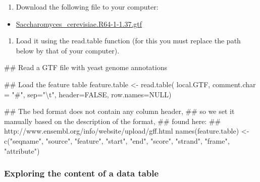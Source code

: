 \documentclass[]{article}
\newenvironment{Shaded}{\begin{snugshade}}{\end{snugshade}}
\newcommand{\KeywordTok}[1]{\textcolor[rgb]{0.94,0.87,0.69}{#1}}
\newcommand{\DataTypeTok}[1]{\textcolor[rgb]{0.87,0.87,0.75}{#1}}
\newcommand{\CharTok}[1]{\textcolor[rgb]{0.86,0.64,0.64}{#1}}
\newcommand{\StringTok}[1]{\textcolor[rgb]{0.80,0.58,0.58}{#1}}
\newcommand{\OtherTok}[1]{\textcolor[rgb]{0.94,0.94,0.56}{#1}}
\newcommand{\NormalTok}[1]{\textcolor[rgb]{0.80,0.80,0.80}{#1}}
\providecommand{\tightlist}{%
  \setlength{\itemsep}{0pt}\setlength{\parskip}{0pt}}
\begin{document}
\begin{enumerate}
\def\labelenumi{\arabic{enumi}.}
\tightlist
\item
  Download the following file to your computer:
\end{enumerate}

\begin{itemize}
\tightlist
\item
  \href{../../data/Saccharomyces_cerevisiae/Saccharomyces_cerevisiae.R64-1-1.37.gtf}{Saccharomyces\_cerevisiae.R64-1-1.37.gtf}
\end{itemize}

\begin{enumerate}
\def\labelenumi{\arabic{enumi}.}
\setcounter{enumi}{1}
\tightlist
\item
  Load it using the read.table function (for this you must replace the
  path below by that of your computer).
\end{enumerate}

\begin{Shaded}
\begin{Highlighting}[]
\NormalTok{## Read a GTF file with yeast genome annotations}

\NormalTok{## Load the feature table}
\NormalTok{feature.table <-}\StringTok{ }\KeywordTok{read.table}\NormalTok{(}
\NormalTok{  local.GTF, }
  \DataTypeTok{comment.char =} \StringTok{"#"}\NormalTok{, }
  \DataTypeTok{sep=}\StringTok{"}\CharTok{\textbackslash{}t}\StringTok{"}\NormalTok{, }
  \DataTypeTok{header=}\OtherTok{FALSE}\NormalTok{, }
  \DataTypeTok{row.names=}\OtherTok{NULL}\NormalTok{)}

\NormalTok{## The bed format does not contain any column header, }
\NormalTok{## so we set it manually based on the description of the format, }
\NormalTok{## found here: }
\NormalTok{##     http://www.ensembl.org/info/website/upload/gff.html}
\KeywordTok{names}\NormalTok{(feature.table) <-}\StringTok{ }\KeywordTok{c}\NormalTok{(}\StringTok{"seqname"}\NormalTok{, }\StringTok{"source"}\NormalTok{, }\StringTok{"feature"}\NormalTok{, }\StringTok{"start"}\NormalTok{, }\StringTok{"end"}\NormalTok{, }\StringTok{"score"}\NormalTok{, }\StringTok{"strand"}\NormalTok{, }\StringTok{"frame"}\NormalTok{, }\StringTok{"attribute"}\NormalTok{)}
\end{Highlighting}
\end{Shaded}

\subsubsection{Exploring the content of a data
table}\label{exploring-the-content-of-a-data-table}
\end{document}
